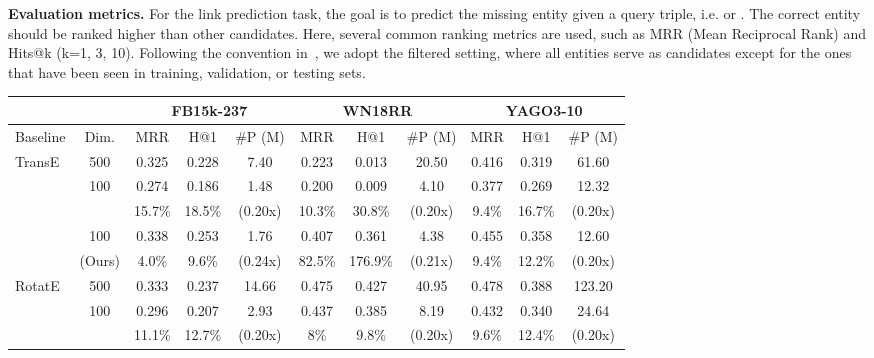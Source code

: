 \documentclass{article}
\begin{document}
{\bf Evaluation metrics.} For the link prediction task, the goal is to
predict the missing entity given a query triple, i.e.  or
. The correct entity should be ranked higher than other
candidates. Here, several common ranking metrics are used, such as MRR
(Mean Reciprocal Rank) and Hits@k (k=1, 3, 10). Following the convention
in~\citet{bordes2013translating}, we adopt the filtered setting, where
all entities serve as candidates except for the ones that have been seen
in training, validation, or testing sets.

\begin{table*}[!t]
\setlength\tabcolsep{3pt}
\centering
\begin{tabular}{l|c | ccc | ccc | ccc}
\hline
&
& \multicolumn{3}{c|}{\textbf{FB15k-237}} 
& \multicolumn{3}{c|}{\textbf{WN18RR}}
& \multicolumn{3}{c}{\textbf{YAGO3-10}} \\
\hline
Baseline & Dim. & MRR & H@1 & \#P (M) 
& MRR & H@1 & \#P (M) 
& MRR & H@1 & \#P (M) \\
\hline 
\multirow{5}{*}{TransE} &
500
& 0.325 & 0.228 & 7.40 
& 0.223 & 0.013 & 20.50
& 0.416 & 0.319 & 61.60 \\

\cline{2-11}

&\multirow{2}{*}{100} 
& 0.274 & 0.186 & 1.48 
& 0.200 & 0.009 & 4.10
& 0.377 & 0.269 & 12.32 \\
&& \textcolor{red}{} 15.7\% & \textcolor{red}{} 18.5\% & (0.20x) 
& \textcolor{red}{} 10.3\% & \textcolor{red}{} 30.8\% & (0.20x) 
& \textcolor{red}{} 9.4\% & \textcolor{red}{} 16.7\% & (0.20x) \\

\cline{2-11}

& 100
& 0.338 & 0.253 & 1.76 
& 0.407 & 0.361 & 4.38 
& 0.455 & 0.358 & 12.60 \\
& (Ours)
& \textcolor{green}{} 4.0\% & \textcolor{green}{} 9.6\% & (0.24x)
& \textcolor{green}{} 82.5\% & \textcolor{green}{} 176.9\% & (0.21x) 
& \textcolor{green}{} 9.4\% & \textcolor{green}{} 12.2\% & (0.20x) \\
\hline\hline

\multirow{5}{*}{RotatE} &
500
& 0.333 & 0.237 & 14.66 
& 0.475 & 0.427 & 40.95
& 0.478 & 0.388 & 123.20 \\

\cline{2-11}

&\multirow{2}{*}{100} 
& 0.296 & 0.207 & 2.93 
& 0.437 & 0.385 & 8.19
& 0.432 & 0.340 & 24.64 \\
&& \textcolor{red}{} 11.1\% & \textcolor{red}{} 12.7\% & (0.20x)
& \textcolor{red}{} 8\% & \textcolor{red}{} 9.8\% & (0.20x)
& \textcolor{red}{} 9.6\% & \textcolor{red}{} 12.4\% & (0.20x) \\


\end{tabular}
\end{table*}
\end{document}
